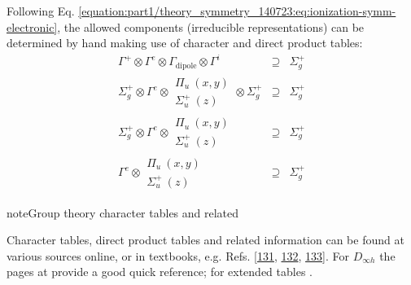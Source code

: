 \documentclass[letterpaper,table,10pt,english]{jupyterBook}
\begin{document}
\sphinxAtStartPar
Following Eq. \eqref{equation:part1/theory_symmetry_140723:eq:ionization-symm-electronic}, the allowed components (irreducible representations) can be determined by hand making use of character and direct product tables:
\label{equation:part2/sym-fitting-intro_220423:c1ccfd34-115b-4814-b3f0-8bf1346a5dae}\begin{eqnarray}
\Gamma^{+}\otimes\Gamma^{e}\otimes\Gamma_{\mathrm{dipole}}\otimes\Gamma^{i} & \supseteq & \Sigma_{g}^{+}\\
\Sigma_{g}^{+}\otimes\Gamma^{e}\otimes\begin{array}{c}
\Pi_{u}~(x,y)\\
\Sigma_{u}^{+}~(z)
\end{array}\otimes\Sigma_{g}^{+} & \supseteq & \Sigma_{g}^{+}\\
\Sigma_{g}^{+}\otimes\Gamma^{e}\otimes\begin{array}{c}
\Pi_{u}~(x,y)\\
\Sigma_{u}^{+}~(z)
\end{array} & \supseteq & \Sigma_{g}^{+}\\
\Gamma^{e}\otimes\begin{array}{c}
\Pi_{u}~(x,y)\\
\Sigma_{u}^{+}~(z)
\end{array} & \supseteq & \Sigma_{g}^{+}
\end{eqnarray}
\begin{sphinxadmonition}{note}{Group theory character tables and related}

\sphinxAtStartPar
Character tables, direct product tables and related information can be found at various sources online, or in textbooks, e.g. Refs. {[}\hyperlink{cite.backmatter/bibliography:id505}{131}, \hyperlink{cite.backmatter/bibliography:id614}{132}, \hyperlink{cite.backmatter/bibliography:id701}{133}{]}. For \(D_{\infty h}\) the pages at  provide a good quick reference; for extended tables .
\end{sphinxadmonition}
\end{document}
